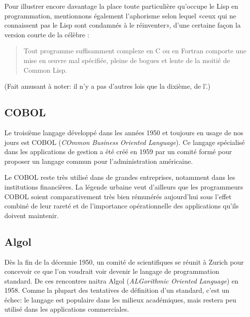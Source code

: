Pour illustrer encore davantage la place toute particulière qu'occupe
le Lisp en programmation, mentionnons également l'aphorisme selon
lequel «ceux qui ne connaissent pas le Lisp sont condamnés à le
réinventer», d'une certaine façon la version courte de la célèbre
: %
\begin{quote}
  Tout programme suffisamment complexe en C ou en Fortran comporte une
  mise en œuvre mal spécifiée, pleine de bogues et lente de la moitié
  de Common Lisp.
\end{quote}
(Fait amusant à noter: il n'y a pas d'autres lois que la dixième, de
l'.)

\subsection{COBOL}
\label{sec:informatique:historique:cobol}

Le troisième langage développé dans les années 1950 et toujours en
usage de nos jours est COBOL (\emph{COmmon Business
  Oriented Language}). Ce langage spécialisé dans les applications de
gestion a été créé en 1959 par un comité formé pour proposer un
langage commun pour l'administration américaine.

Le COBOL reste très utilisé dans de grandes entreprises, notamment
dans les institutions financières. La légende urbaine veut d'ailleurs
que les programmeurs COBOL soient comparativement très bien rémunérés
aujourd'hui sous l'effet combiné de leur rareté et de l'importance
opérationnelle des applications qu'ils doivent maintenir.

\subsection{Algol}
\label{sec:informatique:historique:algol}

Dès la fin de la décennie 1950, un comité de scientifiques se réunit à
Zurich pour concevoir ce que l'on voudrait voir devenir le langage de
programmation standard. De ces rencontres naitra Algol
(\emph{ALGorithmic Oriented Language}) en 1958. Comme la plupart des
tentatives de définition d'un standard, c'est un échec: le langage est
populaire dans les milieux académiques, mais restera peu utilisé dans
les applications commerciales.

